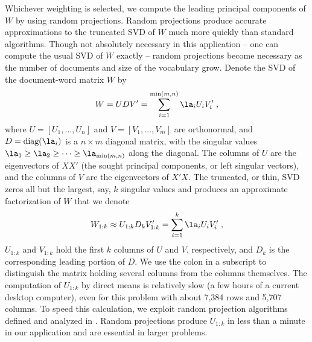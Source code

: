 \documentclass[12pt]{article}
\begin{document}
 
 Whichever weighting is selected, we compute the leading principal components of $W$ 
  by using random projections.
  Random projections produce accurate approximations to the truncated SVD of
 $W$ much more quickly than standard algorithms.  Though not absolutely necessary in this application -- one can compute
 the usual SVD of $W$ exactly -- random projections become necessary as
 the number of documents and size of the vocabulary grow.  Denote the SVD of the
 document-word matrix $W$ by
 \begin{equation}
       W = U D V' = \sum _{i=1}^{\min(m,n)} \la_i U_i V_i' \;,
 \label{eq:W}
 \end{equation}
 where $U = [U_1,\ldots,U_n]$ and $V=[V_1,\ldots,V_m]$ are orthonormal, and $D =
 \mbox{diag}(\la_i)$ is a $n \times m$ diagonal matrix, with the singular values
 $\la_1 \ge \la_2 \ge \cdots \ge \la_{\min(m,n)}$ along the diagonal.  The
 columns of $U$ are the eigenvectors of $XX'$ (the sought principal components,
 or left singular vectors), and the columns of $V$ are the eigenvectors of
 $X'X$.  The truncated, or thin, SVD zeros all but the largest, say, $k$
 singular values and produces an approximate factorization of $W$ that we denote
 \begin{equation}
       W_{1:k} \approx U_{1:k} D_k V_{1:k}' = \sum _{i=1}^k \la_i U_i V_i' \;,
 \label{eq:Wk}
 \end{equation}
 $U_{1:k}$ and $V_{1:k}$ hold the first $k$ columns of $U$ and $V$,
 respectively, and $D_k$ is the corresponding leading portion of $D$. We use the
 colon in a subscript to distinguish the matrix holding several columns from the
 columns themselves.  The computation of $U_{1:k}$ by direct means is relatively
 slow (a few hours of a current desktop computer), even for this problem with
 about 7,384 rows and 5,707 columns.  To speed this calculation, we exploit
 random projection algorithms defined and analyzed in \citet{tropp10}.  Random
 projections produce $U_{1:k}$ in less than a minute in our application and are
 essential in larger problems.
\end{document}
